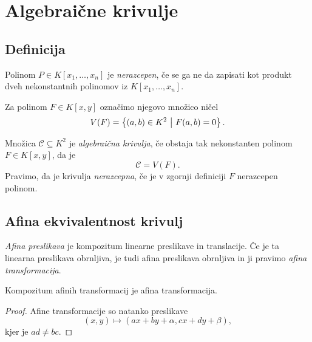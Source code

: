 \section{Algebraične krivulje}

\subsection{Definicija}


\begin{definicija}
Polinom $P \in K[x_1, \dots, x_n]$ je
\emph{nerazcepen}, če se ga ne da zapisati
kot produkt dveh nekonstantnih polinomov iz $K[x_1, \dots, x_n]$.
\end{definicija}

\begin{definicija}
Za polinom $F \in K[x,y]$ označimo njegovo množico ničel
\[
V(F) = \left\{(a,b) \in K^2~\middle\vert~F(a,b) = 0\right\}.
\]
\end{definicija}

\begin{okvir}
\begin{definicija}
Množica $\mathcal{C} \subseteq K^2$ je
\emph{algebraična krivulja}, če obstaja
tak nekonstanten polinom $F \in K[x,y]$, da je
\[
\mathcal{C} = V(F).
\]
Pravimo, da je krivulja
\emph{nerazcepna}, če je v
zgornji definiciji $F$ nerazcepen polinom.
\end{definicija}
\end{okvir}

\newpage

\subsection{Afina ekvivalentnost krivulj}

\begin{definicija}
\emph{Afina preslikava} je kompozitum
linearne preslikave in translacije. Če je ta linearna preslikava
obrnljiva, je tudi afina preslikava obrnljiva in ji pravimo
\emph{afina transformacija}.
\end{definicija}

\begin{trditev}
Kompozitum afinih transformacij je afina transformacija.
\end{trditev}

\begin{proof}
Afine transformacije so natanko preslikave
\[
(x,y) \mapsto (ax + by + \alpha, cx + dy + \beta),
\]
kjer je $ad \ne bc$.
\end{proof}

